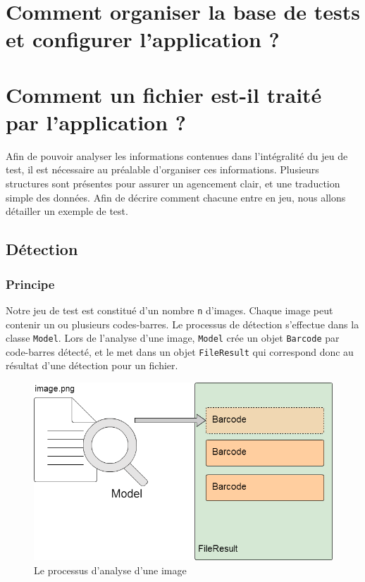 \chapter{Comment organiser la base de tests et configurer l'application ?}















\chapter{Comment un fichier est-il traité par l'application ?}

Afin de pouvoir analyser les informations contenues dans l'intégralité du jeu de test, il est nécessaire au préalable d'organiser ces informations. Plusieurs structures sont présentes pour assurer un agencement clair, et une traduction simple des données. Afin de décrire comment chacune entre en jeu, nous allons détailler un exemple de test.

\section{Détection}

\subsection{Principe}

Notre jeu de test est constitué d'un nombre \verb|n| d'images. Chaque image peut contenir un ou plusieurs codes-barres. Le processus de détection s'effectue dans la classe \verb|Model|. Lors de l'analyse d'une image, \verb|Model| crée un objet \verb|Barcode| par code-barres détecté, et le met dans un objet \verb|FileResult| qui correspond donc au résultat d'une détection pour un fichier.

\begin{figure}
\begin{center}
\includegraphics[scale=0.3]{images/projet1Detection.png}
\caption{Le processus d'analyse d'une image}
\end{center}
\end{figure}

